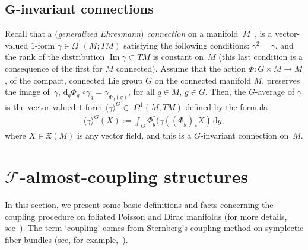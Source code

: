 \documentclass[10pt,a4paper]{amsart}
\numberwithin{equation}{section}
\begin{document}
\subsection[$G$-invariant connections]{$\boldsymbol{G}$-invariant connections}
Recall that a \emph{$($generalized Ehresmann$)$ connection} on a manifold~$M$~\cite{KMS-93}, is a vector-valued $1$-form $\gamma\in\Omega^{1}(M;TM)$ satisfying the following conditions: $\gamma^{2}=\gamma$, and the rank of the distribution $\operatorname*{Im}\gamma\subset TM$ is constant on~$M$ (this last condition is a consequence of the f\/irst for $M$ connected). Assume that the action $\Phi\colon G\times M\rightarrow M$, of the compact, connected Lie group $G$ on the connected manifold $M$, preserves the image of~$\gamma$, $\mathrm{d}_{q}\Phi_{g}$ $\circ\gamma_{q}=\gamma_{\Phi_{g}(q)}$, for all $q\in M$, $g\in G$. Then, the $G$-average of $\gamma$ is the vector-valued $1$-form
$\langle \gamma \rangle^{G}\in$ $\Omega^{1}(M,TM)$ def\/ined by the formula
\begin{gather*}
\langle \gamma \rangle^{G}(X):= \int_{G}\Phi_{g}^{\ast}(\gamma((\Phi_{g})_{\ast}X)\,\mathrm{d}g,
\end{gather*}
where $X\in\mathfrak{X}(M)$ is any vector f\/ield, and this is a $G$-invariant connection on~$M$.

\section[$\mathcal{F}$-almost-coupling structures]{$\boldsymbol{\mathcal{F}}$-almost-coupling structures}

In this section, we present some basic def\/initions and facts concerning the coupling procedure on foliated Poisson and Dirac manifolds (for more details, see~\cite{Va-04,Va-06, Vo-01}). The term `coupling' comes from Sternberg's coupling method on symplectic f\/iber bundles (see, for
example,~\cite{GLS-96}).
\end{document}
